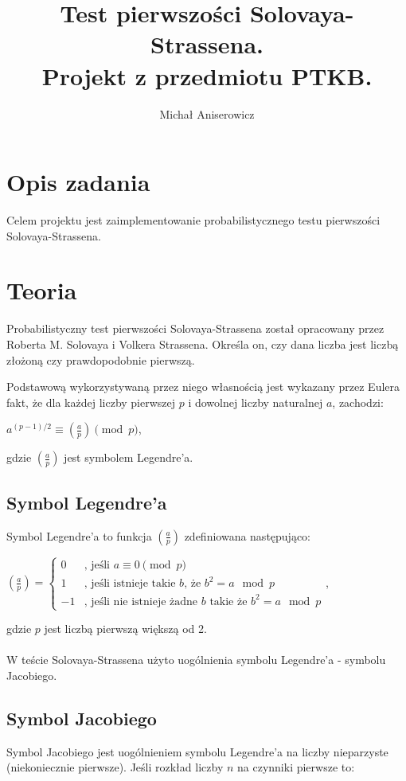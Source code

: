\documentclass[a4paper,10pt]{article}
\title{Test pierwszości Solovaya-Strassena. \\ \small{Projekt z przedmiotu PTKB.}}
\author{Michał Aniserowicz}
\date{}
\begin{document}
\maketitle

\section{Opis zadania} \label{sec:task_desc}
Celem projektu jest zaimplementowanie probabilistycznego testu pierwszości Solovaya-Strassena.

\section{Teoria}
Probabilistyczny test pierwszości Solovaya-Strassena został opracowany przez Roberta M. Solovaya i Volkera Strassena.
Określa on, czy dana liczba jest liczbą złożoną czy prawdopodobnie pierwszą.

Podstawową wykorzystywaną przez niego własnością jest wykazany przez Eulera fakt, że dla każdej liczby pierwszej $p$ i dowolnej liczby naturalnej $a$, zachodzi:

$a^{(p-1)/2} \equiv \left(\frac{a}{p}\right) \pmod p$,

gdzie $\left(\frac{a}{p}\right)$ jest symbolem Legendre'a.

 \subsection{Symbol Legendre'a}
 Symbol Legendre'a to funkcja $\left( \frac a p \right)$ zdefiniowana następująco:

 $
 \left( \frac a p \right) = 
 \begin{cases}
   0 & \mbox{, jeśli $a \equiv 0 \pmod p$} \\
   1 & \mbox{, jeśli istnieje takie $b$, że $b^2=a \mod p$} \\
  -1 & \mbox{, jeśli nie istnieje żadne $b$ takie że $b^2=a \mod p$}
 \end{cases}
 $,

 gdzie $p$ jest liczbą pierwszą większą od 2.
 
 \paragraph{}
 W teście Solovaya-Strassena użyto uogólnienia symbolu Legendre'a - symbolu Jacobiego.

 \subsection{Symbol Jacobiego} \label{sec:jacobi}
 Symbol Jacobiego jest uogólnieniem symbolu Legendre'a na liczby nieparzyste (niekoniecznie pierwsze).
 Jeśli rozkład liczby $n$ na czynniki pierwsze to:
 
\end{document}
